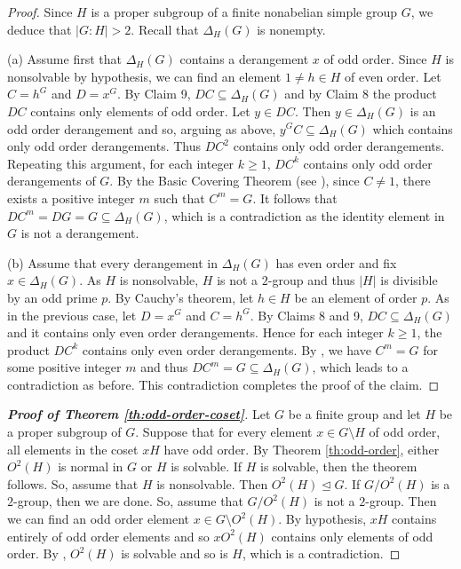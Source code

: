 \documentclass[twoside,a4paper,reqno,11pt]{amsart}
\newcommand{\<}{\langle}
\renewcommand{\>}{\rangle}
\renewcommand{\:}{\colon}
\theoremstyle{definition}
\begin{document}
\begin{proof}
Since $H$ is a proper subgroup of a finite nonabelian simple group $G$, we deduce that $|G:H|>2$. Recall that $\Delta_H(G)$ is nonempty. 

(a) Assume first that  $\Delta_H(G)$ contains a derangement $x$ of odd order.   Since $H$ is nonsolvable by hypothesis, we can find an element $1\neq h\in H$ of even order. Let $C=h^G$ and $D=x^G$. By Claim 9, $DC\subseteq \Delta_H(G)$ and by Claim 8 the product $DC$ contains only elements of odd order. Let $y\in DC.$ Then $y\in \Delta_H(G)$ is an odd order derangement and so, arguing as above, $y^GC\subseteq \Delta_H(G)$ which contains only odd order derangements. Thus $DC^2$ contains only odd order derangements. Repeating this argument, for each integer $k\ge 1$,  $DC^k$ contains only odd order derangements of $G$. By the Basic Covering Theorem (see \cite[Theorem 1.1]{AH}), since $C\neq 1$, there exists a positive integer $m$ such that $C^m=G$. It follows that $DC^m=DG=G\subseteq \Delta_H(G)$, which is a contradiction as the identity element in $G$ is not a derangement.

(b) Assume that every derangement in $\Delta_H(G)$ has even order and fix $x\in \Delta_H(G)$. As $H$ is nonsolvable, $H$ is not a $2$-group and thus $|H|$ is divisible by an odd prime $p$. By Cauchy's theorem, let $h\in H$ be an element of order $p$. As in the previous case, let $D=x^G$ and $C=h^G.$ By Claims 8 and 9, $DC\subseteq \Delta_H(G)$ and it contains only even order derangements. Hence for each integer $k\ge 1$, the product $DC^k$ contains only even order derangements. By \cite[Theorem 1.1]{AH}, we have $C^m=G$ for some positive integer $m$ and thus $DC^m=G\subseteq \Delta_H(G)$, which leads to a contradiction as before. This contradiction completes the proof of the claim.
\end{proof}

\begin{proof}[\textbf{Proof of Theorem \ref{th:odd-order-coset}}]
Let $G$ be a finite group and let $H$ be a proper subgroup of $G$. Suppose that for every element $x\in G\setminus H$ of odd order, all elements in the coset $xH$ have odd order. By Theorem \ref{th:odd-order},  either $O^2(H)$ is normal in $G$ or $H$ is solvable.
If $H$ is solvable, then the theorem follows. So, assume that $H$ is nonsolvable. Then $O^2(H)\unlhd G.$  If $G/O^2(H)$ is a $2$-group, then we are done. So, assume that $G/O^2(H)$ is not a $2$-group. Then we can find an odd order element $x\in G\setminus O^2(H)$. By hypothesis, $xH$ contains entirely of odd order elements and so $xO^2(H)$ contains only elements of odd order. By \cite[Theorem B]{GN}, $O^2(H)$ is solvable and so is $H$, which is a contradiction.
\end{proof}
\end{document}
